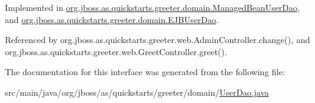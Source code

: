 Implemented in \hyperlink{classorg_1_1jboss_1_1as_1_1quickstarts_1_1greeter_1_1domain_1_1_managed_bean_user_dao_a08dba1ba03f3df2bf92d45532b523e65}{org.\+jboss.\+as.\+quickstarts.\+greeter.\+domain.\+Managed\+Bean\+User\+Dao}, and \hyperlink{classorg_1_1jboss_1_1as_1_1quickstarts_1_1greeter_1_1domain_1_1_e_j_b_user_dao_ac008840023639fd560a40f5bef61da6b}{org.\+jboss.\+as.\+quickstarts.\+greeter.\+domain.\+E\+J\+B\+User\+Dao}.



Referenced by org.\+jboss.\+as.\+quickstarts.\+greeter.\+web.\+Admin\+Controller.\+change(), and org.\+jboss.\+as.\+quickstarts.\+greeter.\+web.\+Greet\+Controller.\+greet().



The documentation for this interface was generated from the following file\+:\begin{DoxyCompactItemize}
\item 
src/main/java/org/jboss/as/quickstarts/greeter/domain/\hyperlink{_user_dao_8java}{User\+Dao.\+java}\end{DoxyCompactItemize}
